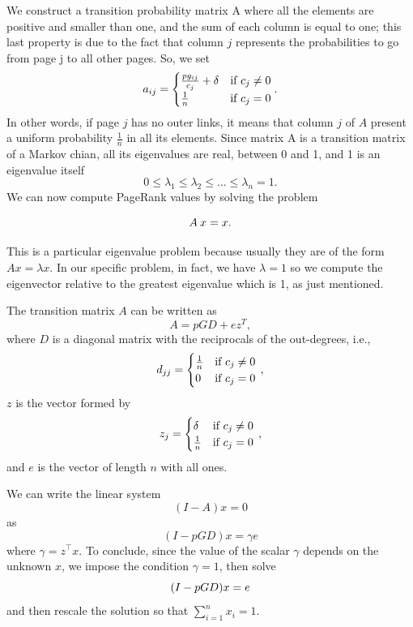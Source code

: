 \documentclass[]{usiinfbachelorproject}
\newcommand\transp[1]{{#1}^{\top}}
\begin{document}
We construct a transition probability matrix A where all the elements are positive and smaller than one, and the sum of each column is equal to one; this last property is due to the fact that column $j$ represents the probabilities to go from page j to all other pages. So, we set
\begin{equation}\notag
a_{ij} = 
\begin{cases}
\frac{pg_{ij}}{c_{j}} + \delta  & \text{if } c_{j} \neq 0\\
\frac{1}{n} & \text{if } c_{j} = 0
\end{cases}.
\end{equation}
In other words, if page $j$ has no outer links, it means that column $j$ of $A$ present a uniform probability $\frac{1}{n}$ in all its elements. Since matrix A is a transition matrix of a Markov chian, all its eigenvalues are real, between 0 and 1, and 1 is an eigenvalue itself
$$0 \leq \lambda_1 \leq \lambda_2 \leq \dots \leq \lambda_n = 1 \text{.}$$
We can now compute PageRank values by solving the problem 

\begin{equation}\notag
A\:x = x \text{.}
\end{equation}

This is a particular eigenvalue problem because usually they are of the form $Ax=\lambda x$. 
In our specific problem, in fact, we have $\lambda = 1$ so we compute the eigenvector relative to the greatest eigenvalue which is 1, as just mentioned.

The transition matrix $A$ can be written as
$$A = pGD+ez^{T}, $$
where $D$ is a diagonal matrix with the reciprocals of the out-degrees, i.e.,
\begin{equation}\notag
d_{jj} = 
\begin{cases}
\frac{1}{n} & \text{if } c_{j} \neq 0\\
0 & \text{if } c_{j} = 0
\end{cases} \,,
\end{equation}
$z$ is the vector formed by
\begin{equation}\notag
z_{j} = 
\begin{cases}
\delta & \text{if } c_{j} \neq 0\\
\frac{1}{n} & \text{if } c_{j} = 0
\end{cases} \,,
\end{equation}
and $e$ is the vector of length $n$ with all ones.

We can write the linear system
$$(I-A)x=0$$
as
$$(I - pGD)x = \gamma e$$
where $\gamma = \transp{z}x$.
To conclude, since the value of the scalar $\gamma$ depends on the unknown $x$, we impose the condition $\gamma = 1$, then solve
\begin{equation}\notag
(I - pGD)x = e
\end{equation}
and then rescale the solution so that $\sum\limits_{i=1}^{n} x_i = 1$.
\end{document}
